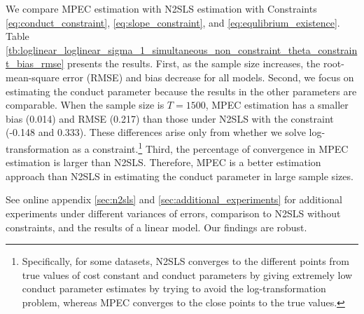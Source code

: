 \documentclass[11pt, a4paper]{article}
\begin{document}
We compare MPEC estimation with N2SLS estimation with Constraints \eqref{eq:conduct_constraint}, \eqref{eq:slope_constraint}, and \eqref{eq:equlibrium_existence}.
Table \ref{tb:loglinear_loglinear_sigma_1_simultaneous_non_constraint_theta_constraint_bias_rmse} presents the results.
First, as the sample size increases, the root-mean-square error (RMSE) and bias decrease for all models. 
Second, we focus on estimating the conduct parameter because the results in the other parameters are comparable.
When the sample size is $T=1500$, MPEC estimation has a smaller bias (0.014) and RMSE (0.217) than those under N2SLS with the constraint (-0.148 and 0.333).
These differences arise only from whether we solve log-transformation as a constraint.\footnote{Specifically, for some datasets, N2SLS converges to the different points from true values of cost constant and conduct parameters by giving extremely low conduct parameter estimates by trying to avoid the log-transformation problem, whereas MPEC converges to the close points to the true values.}
Third, the percentage of convergence in MPEC estimation is larger than N2SLS. 
Therefore, MPEC is a better estimation approach than N2SLS in estimating the conduct parameter in large sample sizes.

See online appendix \ref{sec:n2sls} and \ref{sec:additional_experiments} for additional experiments under different variances of errors, comparison to N2SLS without constraints, and the results of a linear model. 
Our findings are robust.
\end{document}
